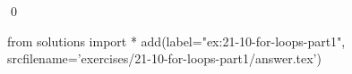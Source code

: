 
\begin{ex}
  \label{ex:21-10-for-loops-part1}
  
  \qed
\end{ex}
\begin{python0}
from solutions import *
add(label="ex:21-10-for-loops-part1",
    srcfilename='exercises/21-10-for-loops-part1/answer.tex')
\end{python0}
